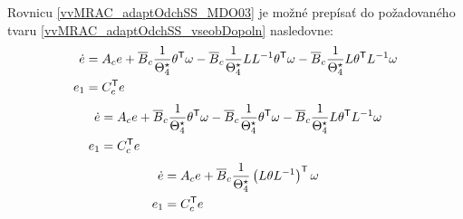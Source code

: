 ﻿\documentclass[a4paper, 10pt, ]{article}
\begin{document}
Rovnicu \eqref{vvMRAC_adaptOdchSS_MDO03} je možné prepísať do požadovaného tvaru \eqref{vvMRAC_adaptOdchSS_vseobDopoln} nasledovne:
\begin{subequations} \label{vvMRAC_adaptOdchSS_MDO04}
	\begin{align}
		\dot{e}
		&=
		A_c
		e
		+
		\overline{B}_c
		\frac{1}{\Theta_4^\star}
		\theta^{\mathsf{T}}
		\omega
		-
		\overline{B}_c
		\frac{1}{\Theta_4^\star}
		L
		L^{-1}
		\theta^{\mathsf{T}}
		\omega
		-
		\overline{B}_c
		\frac{1}{\Theta_4^\star}
		L
		\theta^{\mathsf{T}}
		L^{-1}
		\omega
\\
		e_1
		&=
		C_c^{\mathsf{T}}
		e
	\end{align}
\end{subequations}
\begin{subequations} \label{vvMRAC_adaptOdchSS_MDO05}
	\begin{align}
		\dot{e}
		&=
		A_c
		e
		+
		\overline{B}_c
		\frac{1}{\Theta_4^\star}
		\theta^{\mathsf{T}}
		\omega
		-
		\overline{B}_c
		\frac{1}{\Theta_4^\star}
		\theta^{\mathsf{T}}
		\omega
		-
		\overline{B}_c
		\frac{1}{\Theta_4^\star}
		L
		\theta^{\mathsf{T}}
		L^{-1}
		\omega
\\
		e_1
		&=
		C_c^{\mathsf{T}}
		e
	\end{align}
\end{subequations}
\begin{subequations} \label{vvMRAC_adaptOdchSS_MDO06}
	\begin{align}
		\dot{e}
		&=
		A_c
		e
		+
		\overline{B}_c
		\frac{1}{\Theta_4^\star}
		\left(
			L
			\theta
			L^{-1}
		\right)^{\mathsf{T}}
		\omega
\\
		e_1
		&=
		C_c^{\mathsf{T}}
		e
	\end{align}
\end{subequations}
\end{document}
